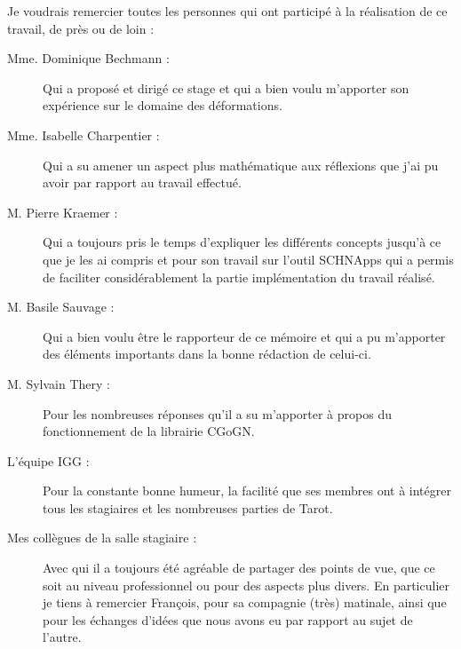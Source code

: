 


\begin{acknowledgementslong}

Je voudrais remercier toutes les personnes qui ont participé à la réalisation
de ce travail, de près ou de loin :

\begin{description} 

\item[Mme. Dominique Bechmann : ] Qui a proposé et dirigé ce stage et qui a
bien voulu m'apporter son expérience sur le domaine des déformations.

\item[Mme. Isabelle Charpentier : ] Qui a su amener un aspect plus
mathématique aux réflexions que j'ai pu avoir par rapport au travail effectué.

\item[M. Pierre Kraemer : ] Qui a toujours pris le temps
d'expliquer les différents concepts jusqu'à ce que je les ai compris et pour
son travail sur l'outil SCHNApps qui a permis de faciliter considérablement
la partie implémentation du travail réalisé.

\item[M. Basile Sauvage : ] Qui a bien voulu être le rapporteur
de ce mémoire et qui a pu m'apporter des éléments importants dans la bonne
rédaction de celui-ci.

\item[M. Sylvain Thery : ] Pour les nombreuses réponses qu'il a
su m'apporter à propos du fonctionnement de la librairie CGoGN.

\item[L'équipe IGG : ] Pour la constante bonne humeur, la facilité
que ses membres ont à intégrer tous les stagiaires et les nombreuses parties
de Tarot.

\item[Mes collègues de la salle stagiaire : ] Avec qui il a toujours été
agréable de partager des points de vue, que ce soit au niveau professionnel ou
pour des aspects plus divers. En particulier je tiens à remercier François,
pour sa compagnie (très) matinale, ainsi que pour les échanges d'idées que
nous avons eu par rapport au sujet de l'autre.

\end{description}

\end{acknowledgementslong}


